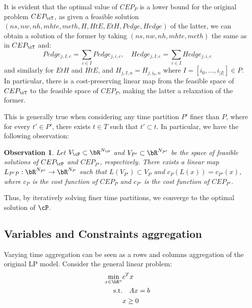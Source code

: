 \documentclass[english]{article}
\newtheorem{observation}[theorem]{Observation}
\numberwithin{definition}{section}
\numberwithin{theorem}{section}
\numberwithin{problem}{section}
\begin{document}
It is evident that the optimal value of \(CEP_P\) is a lower bound for the original problem \(CEP_{\cT}\), as given a feasible solution \((ns, nw, nh, mhte, meth, H, HtE, EtH, Pedge, Hedge)\) of the latter, we can obtain a solution of the former by taking \((ns, nw, nh, mhte, meth)\) the same as in \(CEP_{\cT}\) and:
\[
Pedge_{j,I,e} = \sum_{i \in I} Pedge_{j,i,e}, \quad Hedge_{j,I,e} = \sum_{i \in I} Hedge_{j,i,e}
\]
and similarly for \(EtH\) and \(HtE\), and \(H_{j,I,n} = H_{j,i_0,n}\) where \(I = [i_0,\ldots,i_{|I|}] \in P\). In particular, there is a cost-preserving linear map from the feasible space of \(CEP_{\cT}\) to the feasible space of \(CEP_P\), making the latter a relaxation of the former.

This is generally true when considering any time partition \(P'\) finer than \(P\), where for every \(t' \in P'\), there exists \(t \in T\) such that \(t' \subset t\). In particular, we have the following observation:

\begin{observation}
Let \(V_{\cP} \subset \bR^{N_{\cP}}\) and \(V_{P'} \subset \bR^{N_{P'}}\) be the space of feasible solutions of \(CEP_{\cP}\) and \(CEP_{P'}\), respectively. There exists a linear map \(L_{P'P}: \bR^{N_{P'}} \to \bR^{N_{P}}\) such that \(L(V_{P'}) \subset V_{P}\) and \(c_{P}(L(x)) = c_{P'}(x)\), where \(c_{P}\) is the cost function of \(CEP_{P}\) and \(c_{P'}\) is the cost function of \(CEP_{P'}\).
\end{observation}

Thus, by iteratively solving finer time partitions, we converge to the optimal solution of \(\cP\).
\subsection{Variables and Constraints aggregation}

Varying time aggregation can be seen as a rows and columns aggregation of the original LP model.
Consider the general linear problem:
\begin{align}
\label{eq:LP}
\min_{x \in \bR^{n}} &c^T x \\ 
\text{s.t.} &\quad Ax = b \\
&x \geq 0
\end{align}
\end{document}
